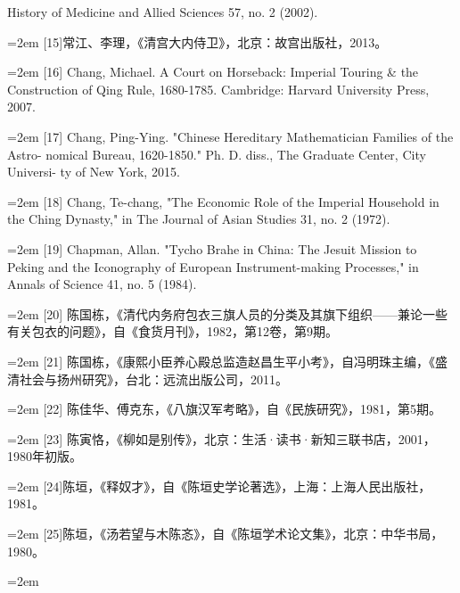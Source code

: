 \space%
History of Medicine and Allied Sciences 57, no. 2 (2002).%
\par
\noindent\hangindent=2em
[15]常江、李理，《清宫大内侍卫》，北京：故宫出版社，2013。%
\par
\noindent\hangindent=2em
[16] Chang, Michael. A Court on Horseback: Imperial Touring \& the Construction of%
\space%
Qing Rule, 1680-1785. Cambridge: Harvard University Press, 2007.%
\par
\noindent\hangindent=2em
[17] Chang, Ping-Ying. "Chinese Hereditary Mathematician Families of the Astro-%
nomical Bureau, 1620-1850." Ph. D. diss., The Graduate Center, City Universi-%
ty of New York, 2015.%
\par
\noindent\hangindent=2em
[18] Chang, Te-chang, "The Economic Role of the Imperial Household in the Ching%
\space%
Dynasty," in The Journal of Asian Studies 31, no. 2 (1972).%
\par
\noindent\hangindent=2em
[19] Chapman, Allan. "Tycho Brahe in China: The Jesuit Mission to Peking and the%
\space%
Iconography of European Instrument-making Processes," in Annals of Science 41,%
\space%
no. 5 (1984).%
\par
\noindent\hangindent=2em
[20] 陈国栋，《清代内务府包衣三旗人员的分类及其旗下组织——兼论一些%
有关包衣的问题》，自《食货月刊》，1982，第12卷，第9期。%
\par
\noindent\hangindent=2em
[21] 陈国栋，《康熙小臣养心殿总监造赵昌生平小考》，自冯明珠主编，《盛%
清社会与扬州研究》，台北：远流出版公司，2011。%
\par
\noindent\hangindent=2em
[22] 陈佳华、傅克东，《八旗汉军考略》，自《民族研究》，1981，第5期。%
\par
\noindent\hangindent=2em
[23] 陈寅恪，《柳如是别传》，北京：生活·读书·新知三联书店，2001，%
1980年初版。%
\par
\noindent\hangindent=2em
[24]陈垣，《释奴才》，自《陈垣史学论著选》，上海：上海人民出版社，%
1981。%
\par
\noindent\hangindent=2em
[25]陈垣，《汤若望与木陈忞》，自《陈垣学术论文集》，北京：中华书局，%
1980。%
\par
\noindent\hangindent=2em
